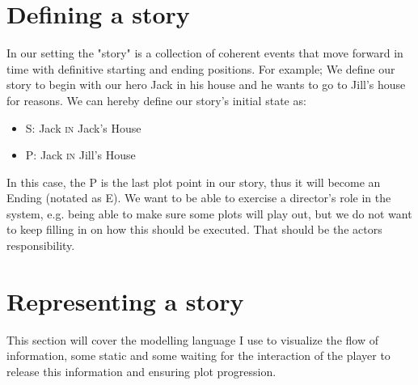 \documentclass[11pt,a4paper,onecolumn,titlepage]{article}
\begin{document}
\section{Defining a story}
In our setting the "story" is a collection of coherent events that move forward in time with definitive starting and ending positions. For example; We define our story to begin with our hero Jack in his house and he wants to go to Jill's house for reasons. We can hereby define our story's initial state as:
\begin{itemize}
\item[] \textsf{S}: Jack \textsc{in} Jack's House
\item[] \textsf{P}: Jack \textsc{in} Jill's House
\end{itemize}
In this case, the \textsf{P} is the last plot point in our story, thus it will become an Ending (notated as \textsf{E}). We want to be able to exercise a director's role in the system, e.g. being able to make sure some plots will play out, but we do not want to keep filling in on how this should be executed. That should be the actors responsibility. 

\section{Representing a story}
This section will cover the modelling language I use to visualize the flow of information, some static and some waiting for the interaction of the player to release this information and ensuring plot progression.
\end{document}
